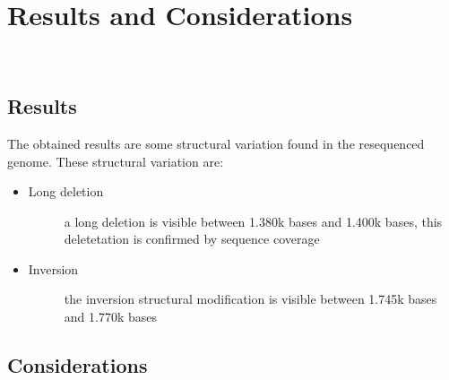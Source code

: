
\chapter{Results and Considerations}
\label{cap:considerations}

\\
\section{Results}

The obtained results are some structural variation found in the resequenced genome.
These structural variation are:
\begin{itemize}
\item \begin{description}
		\item[Long deletion] a long deletion is visible between 1.380k bases and 1.400k bases, this deletetation is confirmed by sequence coverage
  \end{description}
\end{itemize}
\begin{itemize}
\item \begin{description}
		\item[Inversion] the inversion structural modification is visible between 1.745k bases and 1.770k bases
  \end{description}
\end{itemize}

\section{Considerations}
